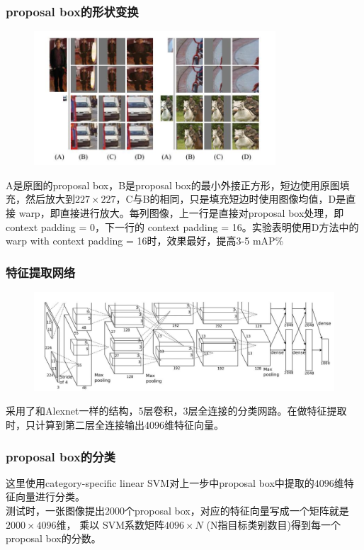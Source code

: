 \documentclass{beamer}
\begin{document}
\begin{frame}
    \frametitle{proposal box的形状变换}
    \begin{figure}
        \centering
        \includegraphics[height=5cm]{graphic/rcnnwarp.jpg}
    \end{figure}
    \scriptsize{A是原图的proposal box，B是proposal box的最小外接正方形，短边使用原图填充，然后放大到$227\times 227$，C与B的相同，只是填充短边时使用图像均值，D是直接 warp，即直接进行放大。每列图像，上一行是直接对proposal box处理，即 context padding = 0，下一行的 context padding = 16。实验表明使用D方法中的 warp with context padding = 16时，效果最好，提高3-5 mAP\%}
\end{frame}

\begin{frame}
    \frametitle{特征提取网络}
    \begin{figure}
        \centering
        \includegraphics[height=3.7cm]{graphic/alexnet.jpg}
    \end{figure}
    采用了和Alexnet一样的结构，5层卷积，3层全连接的分类网路。在做特征提取时，只计算到第二层全连接输出4096维特征向量。
\end{frame}

\begin{frame}
    \frametitle{proposal box的分类}
    这里使用category-specific linear SVM对上一步中proposal box中提取的$4096$维特征向量进行分类。 \\
    \vspace{10pt}
    测试时，一张图像提出$2000$个proposal box，对应的特征向量写成一个矩阵就是$2000\times 4096$维， 乘以 SVM系数矩阵$4096\times N$ (N指目标类别数目)得到每一个proposal box的分数。%
\end{frame}
\end{document}
